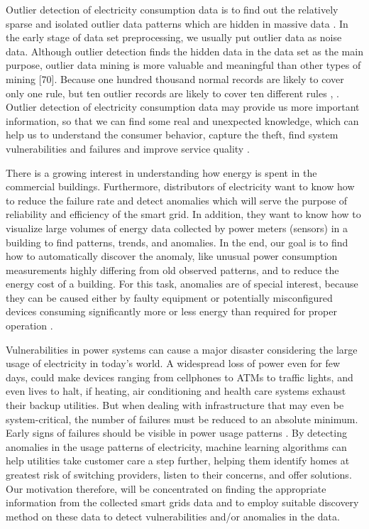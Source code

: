 Outlier detection of electricity consumption data is to find out the relatively sparse and isolated outlier data patterns which are hidden in massive data \cite{chen2016data}. In the early stage of data set preprocessing, we usually put outlier data as noise data. Although outlier detection finds the hidden data in the data set as the main purpose, outlier data mining is more valuable and meaningful than other types of mining [70]. Because one hundred thousand normal records are likely to cover only one rule, but ten outlier records are likely to cover ten different rules \cite{mao2005principle}, \cite{chen2016data}. Outlier detection of electricity consumption data may provide us more important information, so that we can find some real and unexpected knowledge, which can help us to understand the consumer behavior, capture the theft, find system vulnerabilities and failures and improve service quality \cite{pham2014anomaly} .

There is a growing interest in understanding how energy is spent in the commercial buildings. Furthermore, distributors of electricity want to know how to reduce the failure rate and detect anomalies which will serve the purpose of reliability and efficiency of the smart grid. In addition, they want to know how to visualize large volumes of energy data collected by power meters (sensors) in a building to find patterns, trends, and anomalies. In the end, our goal is to find how to automatically discover the anomaly, like unusual power consumption measurements highly differing from old observed patterns, and to reduce the energy cost of a building. For this task, anomalies are of special interest, because they can be caused either by faulty equipment or potentially misconfigured devices consuming significantly more or less energy than required for proper operation \cite{janetzko2014anomaly}.

\frenchspacing Vulnerabilities in power systems can cause a major disaster considering the large usage of electricity in today's world. A widespread loss of power even for few days, could make devices ranging from cellphones to ATMs to traffic lights, and even lives to halt, if heating, air conditioning and health care systems exhaust their backup utilities. But when dealing with infrastructure that may even be system-critical, the number of failures must be reduced to an absolute minimum. Early signs of failures should be visible in power usage patterns \cite{janetzko2014anomaly}. By detecting anomalies in the usage patterns of electricity, machine learning algorithms can help utilities take customer care a step further, helping them identify homes at greatest risk of switching providers, listen to their concerns, and offer solutions. Our motivation therefore, will be concentrated on finding the appropriate information from the collected smart grids data and to employ suitable discovery method on these data to detect vulnerabilities and/or anomalies in the data. 

\frenchspacing

\label{sec:Introduction}